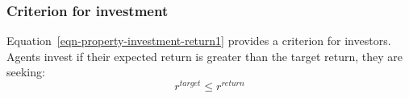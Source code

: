 \subsubsection{Criterion for investment}
Equation~\ref{eqn-property-investment-return1} provides a criterion for investors. Agents invest if  their expected return is greater than the target return, they are seeking:
\begin{equation}
r^{target}\le r^{return} 
\label{eqn-property-investment-return2}
\end{equation}
%
%
% 
